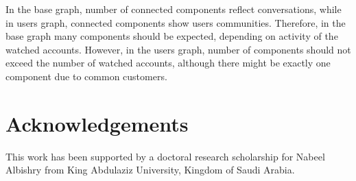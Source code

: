 \documentclass[sigconf]{acmart}
\begin{document}
In the base graph, number of connected components reflect
conversations, while in users graph, connected components show users
communities. Therefore, in the base graph many components should be
expected, depending on activity of the watched accounts. However, in
the users graph, number of components should not exceed the number of
watched accounts, although there might be exactly one component due to
common customers.



\section{Acknowledgements}

This work has been supported by a doctoral research scholarship for
Nabeel Albishry from King Abdulaziz University, Kingdom of Saudi
Arabia.



 
\end{document}
